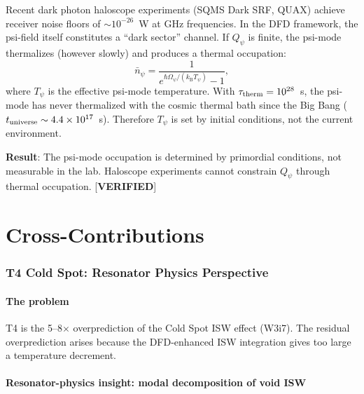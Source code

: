 \documentclass[11pt]{article}
\newcommand{\Opsi}{\Omega_\psi}
\newcommand{\ee}[1]{\times 10^{#1}}
\newcommand{\kB}{k_{\mathrm{B}}}
\newcommand{\Qpsi}{Q_\psi}
\theoremstyle{definition}
\theoremstyle{remark}
\begin{document}
Recent dark photon haloscope experiments (SQMS Dark SRF, QUAX) achieve
receiver noise floors of $\sim 10^{-26}$~W at GHz frequencies. In the
DFD framework, the psi-field itself constitutes a ``dark sector'' channel.
If $\Qpsi$ is finite, the psi-mode thermalizes (however slowly) and
produces a thermal occupation:
\begin{equation}
\bar{n}_\psi = \frac{1}{e^{\hbar\Opsi/(\kB T_\psi)} - 1},
\label{eq:n_psi_thermal}
\end{equation}
where $T_\psi$ is the effective psi-mode temperature. With
$\tau_{\rm therm} = 10^{28}$~s, the psi-mode has never thermalized
with the cosmic thermal bath since the Big Bang
($t_{\rm universe} \sim 4.4\ee{17}$~s). Therefore $T_\psi$ is set
by initial conditions, not the current environment.

\textbf{Result}: The psi-mode occupation is determined by primordial
conditions, not measurable in the lab. Haloscope experiments cannot
constrain $\Qpsi$ through thermal occupation. [\textbf{VERIFIED}]


\part{Cross-Contributions}
\label{part:cross}

\section{T4 Cold Spot: Resonator Physics Perspective}
\label{sec:T4}

\subsection{The problem}

T4 is the 5--8$\times$ overprediction of the Cold Spot ISW effect
(W3i7). The residual overprediction arises because the DFD-enhanced
ISW integration gives too large a temperature decrement.

\subsection{Resonator-physics insight: modal decomposition of void ISW}
\end{document}
